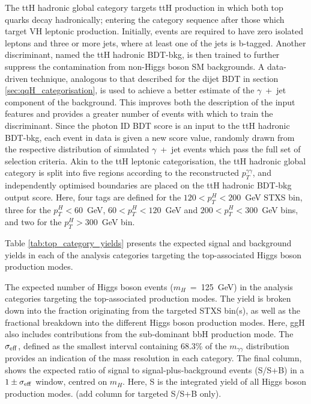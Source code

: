The ttH hadronic global category targets ttH production in which both top quarks decay hadronically; entering the category sequence after those which target VH leptonic production. Initially, events are required to have zero isolated leptons and three or more jets, where at least one of the jets is b-tagged. Another discriminant, named the ttH hadronic BDT-bkg, is then trained to further suppress the contamination from non-Higgs boson SM backgrounds. A data-driven technique, analogous to that described for the dijet BDT in section \ref{sec:qqH_categorisation}, is used to achieve a better estimate of the $\gamma$~+~jet component of the background. This improves both the description of the input features and provides a greater number of events with which to train the discriminant. Since the photon ID BDT score is an input to the ttH hadronic BDT-bkg, each event in data is given a new score value, randomly drawn from the respective distribution of simulated $\gamma$~+~jet events which pass the full set of selection criteria. Akin to the ttH leptonic categorisation, the ttH hadronic global category is split into five regions according to the reconstructed $p_T^{\gamma\gamma}$, and independently optimised boundaries are placed on the ttH hadronic BDT-bkg output score. Here, four tags are defined for the $120<p_T^H<200$~GeV STXS bin, three for the $p_T^H<60$~GeV, $60<p_T^H<120$~GeV and $200<p_T^H<300$~GeV bins, and two for the $p_T^H>300$~GeV bin.

Table \ref{tab:top_category_yields} presents the expected signal and background yields in each of the analysis categories targeting the top-associated Higgs boson production modes.

\begin{table}[htb]
    \caption[Expected yields for the top-associated production mode categories]{The expected number of Higgs boson events ($m_H$~=~125~GeV) in the analysis categories targeting the top-associated production modes. The yield is broken down into the fraction originating from the targeted STXS bin(s), as well as the fractional breakdown into the different Higgs boson production modes. Here, ggH also includes contributions from the sub-dominant bbH production mode. The $\sigma_{\rm{eff}}$, defined as the smallest interval containing 68.3\% of the $m_{\gamma\gamma}$ distribution provides an indication of the mass resolution in each category. The final column, shows the expected ratio of signal to signal-plus-background events (S/S+B) in a $1\pm\sigma_{\rm{eff}}$ window, centred on $m_H$. Here, S is the integrated yield of all Higgs boson production modes. (add column for targeted S/S+B only).}
    \label{tab:top_category_yields}
    \centering
    \scriptsize
    \renewcommand{\arraystretch}{1.3}
    \setlength{\tabcolsep}{2pt}
    
\end{table}

